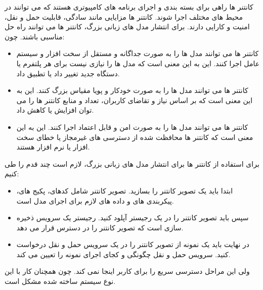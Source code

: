 کانتنر ها راهی برای بسته بندی و اجرای برنامه های کامپیوتری هستند که می توانند در محیط های مختلف اجرا شوند. کانتنر ها مزایایی مانند سادگی، قابلیت حمل و نقل، امنیت و کارایی دارند. برای انتشار مدل های زبانی بزرگ، کانتنر ها می توانند راه حل مناسبی باشند. چون:
\begin{itemize}[label=-]
  \item
   کانتنر ها می توانند مدل ها را به صورت جداگانه و مستقل از سخت افزار و سیستم عامل اجرا کنند. این به این معنی است که مدل ها را نیازی نیست برای هر پلتفرم یا دستگاه جدید تغییر داد یا تطبیق داد.
   \item
   کانتنر ها می توانند مدل ها را به صورت خودکار و پویا مقیاس بزرگ کنند. این به این معنی است که بر اساس نیاز و تقاضای کاربران، تعداد و منابع کانتنر ها را می توان افزایش یا کاهش داد.
   \item
   کانتنر ها می توانند مدل ها را به صورت امن و قابل اعتماد اجرا کنند. این به این معنی است که کانتنر ها محافظت شده از دسترسی های غیرمجاز یا خطای سخت افزار یا نرم افزار هستند.
\end{itemize}
برای استفاده از کانتنر ها برای انتشار مدل های زبانی بزرگ، لازم است چند قدم را طی کنیم:
\begin{itemize}[label=-]
  \item
   ابتدا باید یک تصویر  کانتنر را بسازید. تصویر کانتنر شامل کدهای، پکیج های، پیکربندی های و داده های لازم برای اجرای مدل است.
   \item
   سپس باید تصویر کانتنر را در یک رجیستر  آپلود کنید. رجیستر یک سرویس ذخیره سازی است که تصویر کانتنر را در دسترس قرار می دهد.
   \item
   در نهایت باید یک نمونه  از تصویر کانتنر را در یک سرویس حمل و نقل  درخواست کنید. سرویس حمل و نقل چگونگی و کجای اجرای نمونه را تعیین می کند.
\end{itemize}
ولی این مراحل دسترسی سریع را برای کاربر اینجا نمی کند. چون همچنان کار با این نوع سیستم ساخته شده مشکل است.

